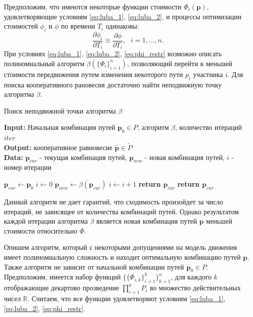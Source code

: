 \documentclass[12pt, a4paper]{article}
\begin{document}
Предположим, что имеются некоторые функции стоимости $\Phi_i (\textbf{p})$, удовлетворяющие условиям \eqref{eq:luba_1}, \eqref{eq:luba_2}, и процессы оптимизации стоимостей $\phi_i$ и $\phi$ по времени $T_i$ одинаковы:
\begin{equation}
	\label{eq:phi_restr}
	\frac{\partial \phi_i}{\partial T_i} \equiv \frac{\partial \phi}{\partial T_i}, \text{ } i = 1, \ldots, n.
\end{equation}
При условиях \eqref{eq:luba_1}, \eqref{eq:luba_2}, \eqref{eq:phi_restr} возможно описать полиномиальный алгоритм $\beta(\{\Phi_i\}_{i = 1}^n)$, позволяющий перейти к меньшей стоимости передвижения путем изменения некоторого пути  $p_i$ участника $i$. Для поиска кооперативного рановесия достаточно найти неподвижную точку алгоритма $\beta$. 

\begin{algorithm}[H]
	\caption{Поиск неподвижной точки алгоритма $\beta$}
	\label{alg:coop_find1}
	{\bf {Input:}} Начальная комбинация путей $\textbf{p}_0 \in P$, алгоритм $\beta$, количество итераций $iter$\\
	{\bf {Output:}} кооперативное равновесие $\widetilde{\textbf{p}} \in \widetilde{P}$\\
	{\bf {Data:}} $\textbf{p}_{cur}$ - текущая комбинация путей, $\textbf{p}_{new}$ - новая комбинация путей, $i$ - номер итерации
	\begin{algorithmic}[1]
		\State $\textbf{p}_{cur} \gets \textbf{p}_0$
		\State $i \gets 0$
		\State $\textbf{p}_{new} \gets \beta (\textbf{p}_{cur}) $
		\State $i \gets i + 1$
			\State \textbf{return $\textbf{p}_{cur}$}
		\EndIf
		\EndWhile
	\State \textbf{return $\textbf{p}_{cur}$}
	\end{algorithmic}
\end{algorithm}

Данный алгоритм не дает гарантий, что сходимость произойдет за число итераций, не зависящее от количества комбинаций путей. Однако результатом каждой итерации алгоритма $\beta$ является новая комбинация путей $\textbf{p}$ меньшей стоимости относительно $\Phi$. 

Опишем алгоритм, который с некоторыми допущениями на модель движения имеет полиномиальную сложность и находит оптимальную комбинацию путей $\textbf{p}$.
Также алгоритм не зависит от начальной комбинации путей $\textbf{p}_0 \in P$. Предположим, имеется набор функций $\{\{\Phi_{i, k} \}_{i = 1}^k\}_{k = 1}^n$, для каждого $k$ отображающие декартово прозведение $\prod\limits_{i = 1}^kP_i$ во множество действительных чисел $\mathbb{R}$. Считаем, что все функции удовлетворяют условиям \eqref{eq:luba_1}, \eqref{eq:luba_2}, \eqref{eq:phi_restr}.
\end{document}
